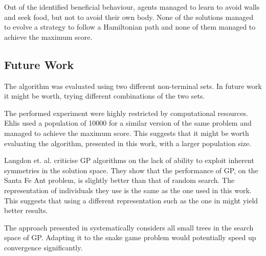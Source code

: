 \documentclass[12pt,a4paper]{article}
\begin{document}
	Out of the identified beneficial behaviour, agents managed to learn to avoid walls and seek food, but not to avoid their own body. None of the solutions managed to evolve a strategy to follow a Hamiltonian path and none of them managed to achieve the maximum score. 
	
	\subsection{Future Work}
	The algorithm was evaluated using two different non-terminal sets. In future work it might be worth, trying different combinations of the two sets. 
	
	The performed experiment were highly restricted by computational resources. Ehlis \cite{ehlis_application_2000} used a population of 10000 for a similar version of the same problem and managed to achieve the maximum score. This suggests that it might be worth evaluating the algorithm, presented in this work, with a larger population size.
	
	Langdon et. al. \cite{langdon_why_1998} criticise GP algorithms on the lack of ability to exploit inherent symmetries in the solution space. They show that the performance of GP, on the Santa Fe Ant problem, is slightly better than that of random search. The representation of individuals they use is the same as the one used in this work. This suggests that using a different representation such as the one in \cite{yeh_snake_2016} might yield better results.
	
	The approach presented in \cite{christensen_solving_2007} systematically	considers all small trees in the search space of GP. Adapting it to the snake game problem would potentially speed up convergence significantly.
	
	
	

	\printbibliography
	
	\appendix
	
\end{document}
